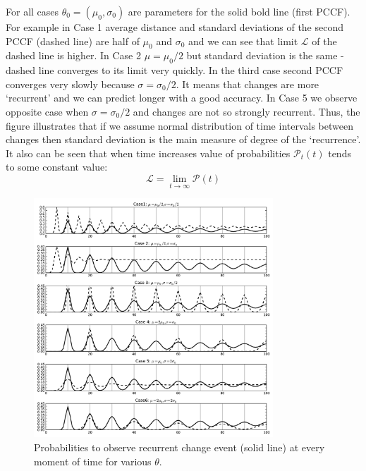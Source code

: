 For all cases $\theta_0 = (\mu_0, \sigma_0)$ are parameters for the solid bold line (first PCCF).
For example in Case 1 average distance and standard deviations of the second PCCF (dashed line) are half of $\mu_0$ and $\sigma_0$ and we can see that limit $\mathcal{L}$ of the dashed line is higher.
In Case 2 $\mu = \mu_0 / 2$ but standard deviation is the same - dashed line converges to its limit very quickly.
In the third case second PCCF converges very slowly because $\sigma = \sigma_0 / 2$. It means that changes are more `recurrent' and we can predict longer with a good accuracy. In Case 5 we observe opposite case when $\sigma = \sigma_0 / 2$ and changes are not so strongly recurrent.
Thus, the figure illustrates that if we assume normal distribution of time intervals between changes then standard deviation is the main measure of degree of the `recurrence'.
It also can be seen that when time increases value of probabilities $\mathcal{P}_{t}(t)$ tends to some constant value:
\begin{equation}
\mathcal{L} = \lim_{t \to \infty} \mathcal{P} (t)
\label{eq:limit}
\end{equation}

\begin{figure}[htb!]
\centering
\includegraphics[width=0.8\textwidth]{pics/recprobs.pdf}
\caption{
Probabilities to observe recurrent change event (solid line) at every moment of time for various $\theta$.
}
\label{fig:recprobs}
\end{figure}

